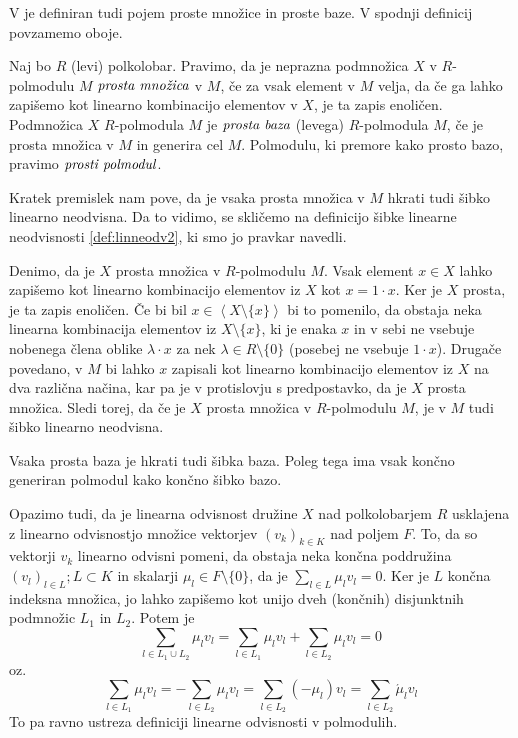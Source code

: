 \documentclass[mat1]{fmfdelo}
\newcommand{\pojem}[1]{\ensuremath{\emph{#1}}}
\newcommand{\Gen}[1]{\ensuremath{\left<{#1}\right>}}
\begin{document}
V \cite[definicija 2.~3.]{bib:Tanbase} je definiran tudi pojem proste množice in proste baze. V spodnji definicij povzamemo oboje.
\begin{definicija}
	Naj bo $R$ (levi) polkolobar. Pravimo, da je neprazna podmnožica $X$ v $R$-polmodulu $M$ \pojem{prosta množica} v $M$, če za vsak element v $M$ velja, da če ga lahko zapišemo kot linearno kombinacijo elementov v $X$, je ta zapis enoličen.
	Podmnožica $X$ $R$-polmodula $M$ je \pojem{prosta baza} (levega) $R$-polmodula $M$, če je prosta množica v $M$ in generira cel $M$. Polmodulu, ki premore kako prosto bazo, pravimo \pojem{prosti polmodul}.
\end{definicija}

Kratek premislek nam pove, da je vsaka prosta množica v $M$ hkrati tudi šibko linearno neodvisna. Da to vidimo, se skličemo na definicijo šibke linearne neodvisnosti \ref{def:linneodv2}, ki smo jo pravkar navedli.

Denimo, da je $X$ prosta množica v $R$-polmodulu $M$. Vsak element $x\in X$ lahko zapišemo kot linearno kombinacijo elementov iz $X$ kot $x = 1\cdot x$. Ker je $X$ prosta, je ta zapis enoličen. Če bi bil $x \in\Gen{X\setminus\{x\}}$ bi to pomenilo, da obstaja neka linearna kombinacija elementov iz $X\setminus\{x\}$, ki je enaka $x$ in v sebi ne vsebuje nobenega člena oblike $\lambda\cdot x$ za nek $\lambda\in R\setminus\{0\}$ (posebej ne vsebuje $1\cdot x$). Drugače povedano, v $M$ bi lahko $x$ zapisali kot linearno kombinacijo elementov iz $X$ na dva različna načina, kar pa je v protislovju s predpostavko, da je $X$ prosta množica. Sledi torej, da če je $X$ prosta množica v $R$-polmodulu $M$, je v $M$ tudi šibko linearno neodvisna.

\begin{opomba}
	Vsaka prosta baza je hkrati tudi šibka baza. Poleg tega ima vsak končno generiran polmodul kako končno šibko bazo.
\end{opomba}

Opazimo tudi, da je linearna odvisnost družine $X$ nad polkolobarjem $R$ usklajena z linearno odvisnostjo množice vektorjev $(v_k)_{k\in K}$ nad poljem $F$.
To, da so vektorji $v_k$ linearno odvisni pomeni, da obstaja neka končna poddružina $(v_l)_{l\in L}; L\subset K$ in skalarji $\mu_l\in F\setminus\{0\}$, da je $\sum_{l\in L}\mu_lv_l = 0$. Ker je $L$ končna indeksna množica, jo lahko zapišemo kot unijo dveh (končnih) disjunktnih podmnožic $L_1$ in $L_2$. Potem je $$ \sum_{l\in L_1\cup L_2} \mu_lv_l = \sum_{l\in L_1}\mu_lv_l + \sum_{l\in L_2}\mu_lv_l = 0$$ oz. $$\sum_{l\in L_1}\mu_lv_l = - \sum_{l\in L_2}\mu_lv_l = \sum_{l\in L_2} (-\mu_l)v_l = \sum_{l\in L_2}\acute{\mu}_lv_l $$
To pa ravno ustreza definiciji linearne odvisnosti v polmodulih. 
\end{document}
